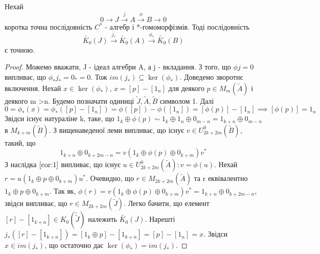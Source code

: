 \begin{theorem}
    \label{трм:слабка точність}
    Нехай
    \begin{equation*}
        0 \rightarrow J \xrightarrow{j}  A \xrightarrow{\phi} B \rightarrow 0
    \end{equation*}
    коротка точна послідовність $C^*$ - алгебр і *-гомоморфізмів.
    Тоді послідовність
    \begin{equation*}
        \widetilde{K_0}(J) \xrightarrow{j_*}  \widetilde{K_0}(A) \xrightarrow{\phi_*} \widetilde{K_0}(B)
    \end{equation*}
    є точною.
    \begin{proof}
        Можемо вважати, J - ідеал алгебри A, а j - вкладання.
        З того, що $\phi j = 0$ випливає, що $\phi_* j_* = 0_* = 0$.
        Тож $im(j_*) \subseteq \ker(\phi_*)$.
        Доведемо зворотнє включення.
        Нехай $x \in \ker(\phi_*)$, $x = [p] - [1_n]$ для деякого $p \in M_m(\widetilde{A})$
        і деякого m >n.
        Будемо позначати одиниці $\widetilde{J},\widetilde{A},\widetilde{B}$ символом 1.
        Далі $0 = \phi_*(x) = \phi_*([p] - [1_n]) = \phi([p]) - \phi([1_n]) = [\phi(p)] - [1_n] \implies [\phi(p)] = 1_n$
        Звідси існує натураліне k, таке, що
        $1_k \oplus \phi(p) \sim 1_k \oplus 1_n \oplus 0_{m - n} = 1_{k+n} \oplus 0_{m - n}$ в $M_{k+m}(\widetilde{B})$.
        З вищенаведеної леми випливає, що існує $v \in U_{2k + 2m}^0(\widetilde{B})$, такий, що
        \begin{equation*}
            1_{k+n} \oplus 0_{k + 2m - n} = v(1_k \oplus \phi(p) \oplus 0_{k + m})v^*
        \end{equation*}
        З наслідка $\ref{cor:1}$ випливає, що існує $u \in U_{2k+2m}^0(\widetilde{A}): v = \phi(u)$.
        Нехай $r = u(1_k \oplus p \oplus 0_{k+m})u^*$.
        Очевидно, що $r \in M_{2k+2m}(\widetilde{A})$ та r еквівалентно $1_k \oplus p \oplus 0_{k+m}$.
        Так як, $\phi(r) = v(1_k \oplus \phi(p) \oplus 0_{k + m})v^* = 1_{k+n} \oplus 0_{k + 2m - n}$,
        звідси випливає, що $r \in M_{2k + 2m}(\widetilde{J})$.
        Легко бачити, що елемент $[r] - [1_{k+n}] \in K_0(\widetilde{\widetilde{J}})$ належить $\widetilde{K_0}(J)$.
        Нарешті $j_*([r] - [1_{k+n}]) = [1_k \oplus p] - [1_{k+n}] = [p] - [1_n] = x$.
        Звідси $x \in im(j_*)$, що остаточно дає $\ker(\phi_*) = im(j_*)$.
    \end{proof}
\end{theorem}

